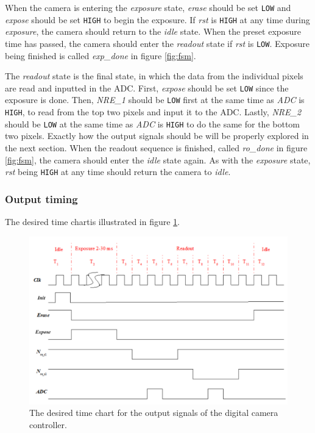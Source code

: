 When the camera is entering the \emph{exposure} state, \emph{erase} should be set \verb|LOW| and \emph{expose} should be set \verb|HIGH| to begin the exposure. If \emph{rst} is \verb|HIGH| at any time during \emph{exposure}, the camera should return to the \emph{idle} state. When the preset exposure time has passed, the camera should enter the \emph{readout} state if \emph{rst} is \verb|LOW|. Exposure being finished is called \emph{exp\_done} in figure \ref{fig:fsm}.

The \emph{readout} state is the final state, in which the data from the individual pixels are read and inputted in the ADC. First, \emph{expose} should be set \verb|LOW| since the exposure is done. Then, \emph{NRE\_1} should be \verb|LOW| first at the same time as \emph{ADC} is \verb|HIGH|, to read from the top two pixels and input it to the ADC. Lastly, \emph{NRE\_2} should be \verb|LOW| at the same time as \emph{ADC} is \verb|HIGH| to do the same for the bottom two pixels. Exactly how the output signals should be will be properly explored in the next section. When the readout sequence is finished, called \emph{ro\_done} in figure \ref{fig:fsm}, the camera should enter the \emph{idle} state again. As with the \emph{exposure} state, \emph{rst} being \verb|HIGH| at any time should return the camera to \emph{idle}.

\subsubsection{Output timing}

The desired time chartis illustrated in figure \ref{fig:timechart}.

\begin{figure}[H]
    \centering
    \includegraphics[width=\textwidth]{graphs/time_chart.png}
    \caption{The desired time chart for the output signals of the digital camera controller.}
    \label{fig:timechart}
\end{figure}

